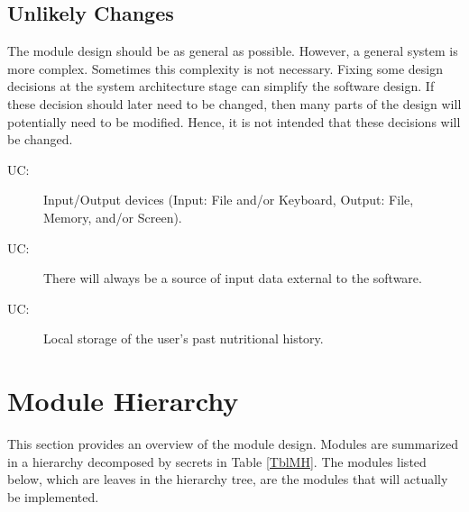 \documentclass[12pt, titlepage]{article}
\newcounter{ucnum}
\newcommand{\uctheucnum}{UC\theucnum}
\begin{document}
\subsection{Unlikely Changes} \label{SecUchange}

The module design should be as general as possible. However, a general system is
more complex. Sometimes this complexity is not necessary. Fixing some design
decisions at the system architecture stage can simplify the software design. If
these decision should later need to be changed, then many parts of the design
will potentially need to be modified. Hence, it is not intended that these
decisions will be changed.

\begin{description}
\item[ \uctheucnum \label{ucIO}:] Input/Output devices
  (Input: File and/or Keyboard, Output: File, Memory, and/or Screen).
\item [ \uctheucnum \label{ucIO}:] There will always be a source of input data external to the software.
\item [ \uctheucnum \label{ucIO}:] Local storage of the user's past nutritional history.
\end{description}

\section{Module Hierarchy} \label{SecMH}

This section provides an overview of the module design. Modules are summarized
in a hierarchy decomposed by secrets in Table \ref{TblMH}. The modules listed
below, which are leaves in the hierarchy tree, are the modules that will
actually be implemented.
\end{document}
